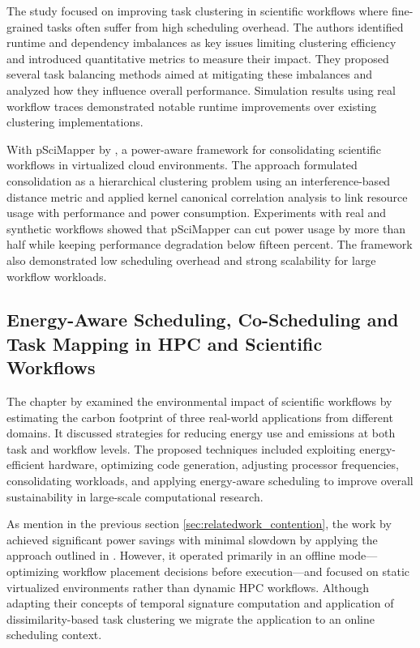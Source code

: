 The study focused on improving task clustering in scientific workflows where fine-grained tasks often suffer from high scheduling overhead. The authors identified runtime and dependency imbalances as key issues limiting clustering efficiency and introduced quantitative metrics to measure their impact. They proposed several task balancing methods aimed at mitigating these imbalances and analyzed how they influence overall performance. Simulation results using real workflow traces demonstrated notable runtime improvements over existing clustering implementations.

With pSciMapper by \cite{5644899}, a power-aware framework for consolidating scientific workflows in virtualized cloud environments. The approach formulated consolidation as a hierarchical clustering problem using an interference-based distance metric and applied kernel canonical correlation analysis to link resource usage with performance and power consumption. Experiments with real and synthetic workflows showed that pSciMapper can cut power usage by more than half while keeping performance degradation below fifteen percent. The framework also demonstrated low scheduling overhead and strong scalability for large workflow workloads.

\subsection{Energy-Aware Scheduling, Co-Scheduling and Task Mapping in HPC and Scientific Workflows}
\label{sec:relatedwork_scheduling}

The chapter by \cite{thamsen2025energyawareworkflowexecutionoverview} examined the environmental impact of scientific workflows by estimating the carbon footprint of three real-world applications from different domains. It discussed strategies for reducing energy use and emissions at both task and workflow levels. The proposed techniques included exploiting energy-efficient hardware, optimizing code generation, adjusting processor frequencies, consolidating workloads, and applying energy-aware scheduling to improve overall sustainability in large-scale computational research.

As mention in the previous section \ref{sec:relatedwork_contention}, the work by \cite{5644899} achieved significant power savings with minimal slowdown by applying the approach outlined in \cite{thamsen2025energyawareworkflowexecutionoverview}. However, it operated primarily in an offline mode—optimizing workflow placement decisions before execution—and focused on static virtualized environments rather than dynamic HPC workflows. Although adapting their concepts of temporal signature computation and application of dissimilarity-based task clustering we migrate the application to an online scheduling context.


